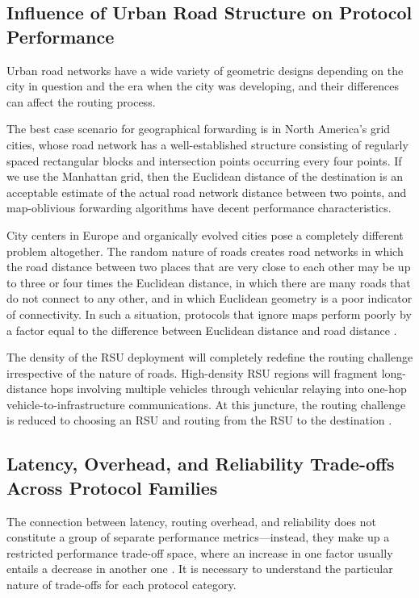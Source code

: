 \documentclass[12pt]{article}
\begin{document}
\subsection{Influence of Urban Road Structure on Protocol Performance}

Urban road networks have a wide variety of geometric designs depending on the city in question and the era when the city was developing, and their differences can affect the routing process.

The best case scenario for geographical forwarding is in North America’s grid cities, whose road network has a well-established structure consisting of regularly spaced rectangular blocks and intersection points occurring every four points. If we use the Manhattan grid, then the Euclidean distance of the destination is an acceptable estimate of the actual road network distance between two points, and map-oblivious forwarding algorithms have decent performance characteristics.

City centers in Europe and organically evolved cities pose a completely different problem altogether. The random nature of roads creates road networks in which the road distance between two places that are very close to each other may be up to three or four times the Euclidean distance, in which there are many roads that do not connect to any other, and in which Euclidean geometry is a poor indicator of connectivity. In such a situation, protocols that ignore maps perform poorly by a factor equal to the difference between Euclidean distance and road distance \cite{nzouonta2009vanet}.

The density of the RSU deployment will completely redefine the routing challenge irrespective of the nature of roads. High-density RSU regions will fragment long-distance hops involving multiple vehicles through vehicular relaying into one-hop vehicle-to-infrastructure communications. At this juncture, the routing challenge is reduced to choosing an RSU and routing from the RSU to the destination \cite{lequerica2010improvement}.

\subsection{Latency, Overhead, and Reliability Trade-offs Across Protocol Families}

The connection between latency, routing overhead, and reliability does not constitute a group of separate performance metrics---instead, they make up a restricted performance trade-off space, where an increase in one factor usually entails a decrease in another one \cite{li2007routing}. It is necessary to understand the particular nature of trade-offs for each protocol category.
\end{document}
